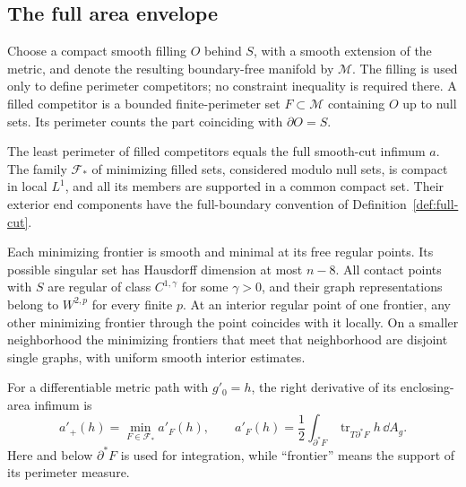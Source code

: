 \subsection{The full area envelope}

Choose a compact smooth filling $O$ behind $S$, with a smooth extension
of the metric, and denote the resulting boundary-free manifold by
$\mathcal M$.  The filling is used only to define perimeter
competitors; no constraint inequality is required there.  A filled
competitor is a bounded finite-perimeter set $F\subset\mathcal M$
containing $O$ up to null sets.  Its perimeter counts the part coinciding
with $\partial O=S$.

\begin{proposition}
\label{var:area-envelope}
The least perimeter of filled competitors equals the full smooth-cut
infimum $a$.  The family $\mathcal F_*$ of minimizing filled sets,
considered modulo null sets, is compact in local $L^1$, and all its
members are supported in a common compact set.  Their exterior end
components have the full-boundary convention of
Definition~\ref{def:full-cut}.

Each minimizing frontier is smooth and minimal at its free regular
points.  Its possible singular set has Hausdorff dimension at most
$n-8$.  All contact points with $S$ are regular of class $C^{1,\gamma}$
for some $\gamma>0$, and their graph representations belong to
$W^{2,p}$ for every finite $p$.  At an interior regular point of one
frontier, any other minimizing frontier through the point coincides
with it locally.  On a smaller neighborhood the minimizing frontiers
that meet that neighborhood are disjoint single graphs, with uniform
smooth interior estimates.

For a differentiable metric path with $g'_0=h$, the right derivative
of its enclosing-area infimum is
\begin{equation}
 a'_+(h)=\min_{F\in\mathcal F_*} a'_F(h),\qquad
 a'_F(h)=\frac12\int_{\partial^*F}
                       \operatorname{tr}_{T\partial^*F}h\,\dd A_g.
 \label{var:envelope-derivative}
\end{equation}
Here and below $\partial^*F$ is used for integration, while
``frontier'' means the support of its perimeter measure.
\end{proposition}

